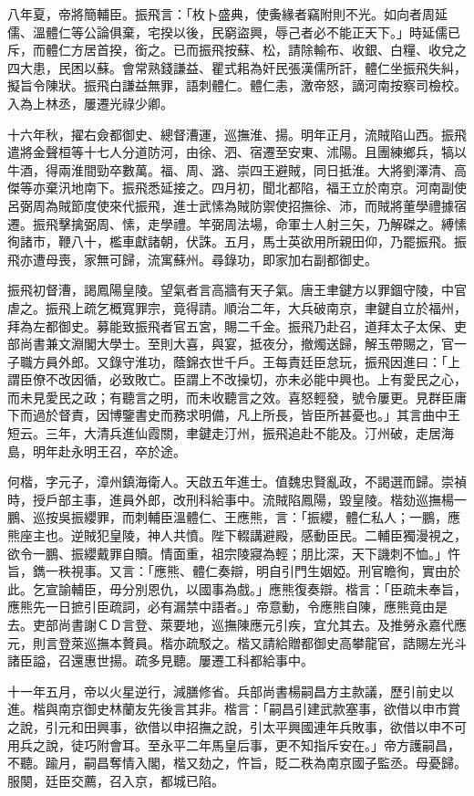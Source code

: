 \begin{pinyinscope}
八年夏，帝將簡輔臣。振飛言：「枚卜盛典，使夤緣者竊附則不光。如向者周延儒、溫體仁等公論俱棄，宅揆以後，民窮盜興，辱己者必不能正天下。」時延儒已斥，而體仁方居首揆，銜之。已而振飛按蘇、松，請除輸布、收銀、白糧、收兌之四大患，民困以蘇。會常熟錢謙益、瞿式耜為奸民張漢儒所訐，體仁坐振飛失糾，擬旨令陳狀。振飛白謙益無罪，語刺體仁。體仁恚，激帝怒，謫河南按察司檢校。入為上林丞，屢遷光祿少卿。

十六年秋，擢右僉都御史、總督漕運，巡撫淮、揚。明年正月，流賊陷山西。振飛遣將金聲桓等十七人分道防河，由徐、泗、宿遷至安東、沭陽。且團練鄉兵，犒以牛酒，得兩淮間勁卒數萬。福、周、潞、崇四王避賊，同日抵淮。大將劉澤清、高傑等亦棄汛地南下。振飛悉延接之。四月初，聞北都陷，福王立於南京。河南副使呂弼周為賊節度使來代振飛，進士武愫為賊防禦使招撫徐、沛，而賊將董學禮據宿遷。振飛擊擒弼周、愫，走學禮。竿弼周法場，命軍士人射三矢，乃解磔之。縛愫徇諸市，鞭八十，檻車獻諸朝，伏誅。五月，馬士英欲用所親田仰，乃罷振飛。振飛亦遭母喪，家無可歸，流寓蘇州。尋錄功，即家加右副都御史。

振飛初督漕，謁鳳陽皇陵。望氣者言高牆有天子氣。唐王聿鍵方以罪錮守陵，中官虐之。振飛上疏乞概寬罪宗，竟得請。順治二年，大兵破南京，聿鍵自立於福州，拜為左都御史。募能致振飛者官五宮，賜二千金。振飛乃赴召，道拜太子太保、吏部尚書兼文淵閣大學士。至則大喜，與宴，抵夜分，撤燭送歸，解玉帶賜之，官一子職方員外郎。又錄守淮功，蔭錦衣世千戶。王每責廷臣怠玩，振飛因進曰：「上謂臣僚不改因循，必致敗亡。臣謂上不改操切，亦未必能中興也。上有愛民之心，而未見愛民之政；有聽言之明，而未收聽言之效。喜怒輕發，號令屢更。見群臣庸下而過於督責，因博鑒書史而務求明備，凡上所長，皆臣所甚憂也。」其言曲中王短云。三年，大清兵進仙霞關，聿鍵走汀州，振飛追赴不能及。汀州破，走居海島，明年赴永明王召，卒於途。

何楷，字元子，漳州鎮海衛人。天啟五年進士。值魏忠賢亂政，不謁選而歸。崇禎時，授戶部主事，進員外郎，改刑科給事中。流賊陷鳳陽，毀皇陵。楷劾巡撫楊一鵬、巡按吳振纓罪，而刺輔臣溫體仁、王應熊，言：「振纓，體仁私人；一鵬，應熊座主也。逆賊犯皇陵，神人共憤。陛下輟講避殿，感動臣民。二輔臣獨漫視之，欲令一鵬、振纓戴罪自贖。情面重，祖宗陵寢為輕；朋比深，天下譏刺不恤。」忤旨，鐫一秩視事。又言：「應熊、體仁奏辯，明自引門生姻婭。刑官瞻徇，實由於此。乞宣諭輔臣，毋分別恩仇，以國事為戲。」應熊復奏辯。楷言：「臣疏未奉旨，應熊先一日摭引臣疏詞，必有漏禁中語者。」帝意動，令應熊自陳，應熊竟由是去。吏部尚書謝ＣＤ言登、萊要地，巡撫陳應元引疾，宜允其去。及推勞永嘉代應元，則言登萊巡撫本贅員。楷亦疏駁之。楷又請給贈都御史高攀龍官，誥賜左光斗諸臣謚，召還惠世揚。疏多見聽。屢遷工科都給事中。

十一年五月，帝以火星逆行，減膳修省。兵部尚書楊嗣昌方主款議，歷引前史以進。楷與南京御史林蘭友先後言其非。楷言：「嗣昌引建武款塞事，欲借以申市賞之說，引元和田興事，欲借以申招撫之說，引太平興國連年兵敗事，欲借以申不可用兵之說，徒巧附會耳。至永平二年馬皇后事，更不知指斥安在。」帝方護嗣昌，不聽。踰月，嗣昌奪情入閣，楷又劾之，忤旨，貶二秩為南京國子監丞。母憂歸。服闋，廷臣交薦，召入京，都城已陷。


\end{pinyinscope}
